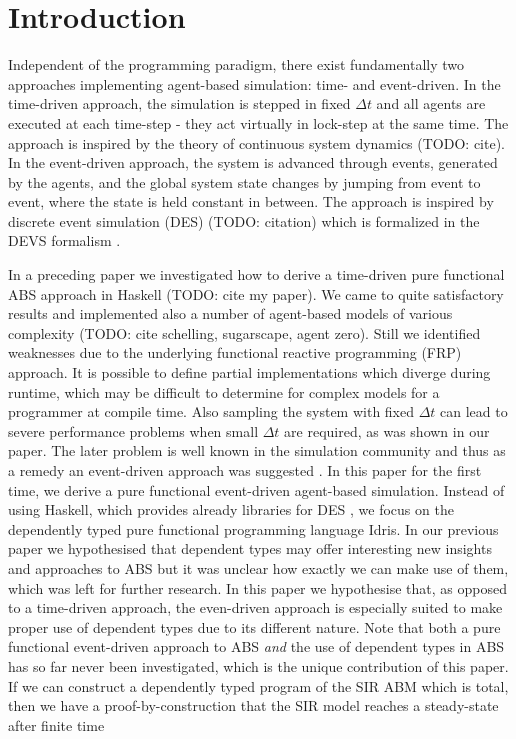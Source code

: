 \section{Introduction}
Independent of the programming paradigm, there exist fundamentally two approaches implementing agent-based simulation: time- and event-driven. In the time-driven approach, the simulation is stepped in fixed $\Delta t$ and all agents are executed at each time-step - they act virtually in lock-step at the same time. The approach is inspired by the theory of continuous system dynamics (TODO: cite).
In the event-driven approach, the system is advanced through events, generated by the agents, and the global system state changes by jumping from event to event, where the state is held constant in between. The approach is inspired by discrete event simulation (DES) (TODO: citation) which is formalized in the DEVS formalism \cite{zeigler_theory_2000}.

In a preceding paper we investigated how to derive a time-driven pure functional ABS approach in Haskell (TODO: cite my paper). We came to quite satisfactory results and implemented also a number of agent-based models of various complexity (TODO: cite schelling, sugarscape, agent zero). Still we identified weaknesses due to the underlying functional reactive programming (FRP) approach. It is possible to define partial implementations which diverge during runtime, which may be difficult to determine for complex models for a programmer at compile time. Also sampling the system with fixed $\Delta t$ can lead to severe performance problems when small $\Delta t$ are required, as was shown in our paper. The later problem is well known in the simulation community and thus as a remedy an event-driven approach was suggested \cite{meyer_event-driven_2014}.
In this paper for the first time, we derive a pure functional event-driven agent-based simulation. Instead of using Haskell, which provides already libraries for DES \cite{sorokin_aivika_2015}, we focus on the dependently typed pure functional programming language Idris. In our previous paper we hypothesised that dependent types may offer interesting new insights and approaches to ABS but it was unclear how exactly we can make use of them, which was left for further research. In this paper we hypothesise that, as opposed to a time-driven approach, the even-driven approach is especially suited to make proper use of dependent types due to its different nature. Note that both a pure functional event-driven approach to ABS \textit{and} the use of dependent types in ABS has so far never been investigated, which is the unique contribution of this paper.
If we can construct a dependently typed program of the SIR ABM which is total, then we have a proof-by-construction that the SIR model reaches a steady-state after finite time

